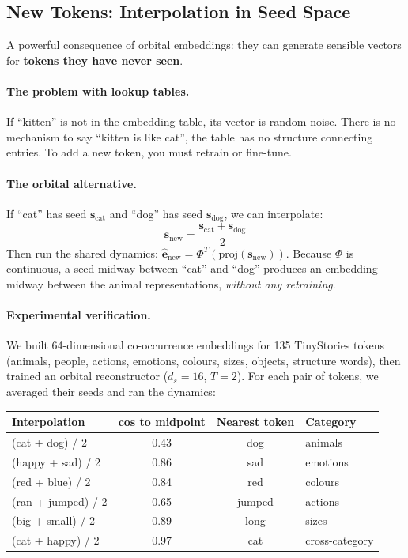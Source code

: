 \documentclass[11pt, a4paper]{article}
\newcommand{\s}{\mathbf{s}}
\theoremstyle{remark}
\begin{document}
\subsection{New Tokens: Interpolation in Seed Space}

A powerful consequence of orbital embeddings: they can generate sensible vectors for \textbf{tokens they have never seen}.

\paragraph{The problem with lookup tables.}
If ``kitten'' is not in the embedding table, its vector is random noise.
There is no mechanism to say ``kitten is like cat'', the table has no structure connecting entries.
To add a new token, you must retrain or fine-tune.

\paragraph{The orbital alternative.}
If ``cat'' has seed $\s_{\text{cat}}$ and ``dog'' has seed $\s_{\text{dog}}$, we can interpolate:
\[
    \s_{\text{new}} = \frac{\s_{\text{cat}} + \s_{\text{dog}}}{2}
\]
Then run the shared dynamics: $\hat{\mathbf{e}}_{\text{new}} = \Phi^T(\text{proj}(\s_{\text{new}}))$.
Because $\Phi$ is continuous, a seed midway between ``cat'' and ``dog'' produces an embedding midway between the animal representations, \emph{without any retraining}.

\paragraph{Experimental verification.}
We built 64-dimensional co-occurrence embeddings for 135 TinyStories tokens (animals, people, actions, emotions, colours, sizes, objects, structure words), then trained an orbital reconstructor ($d_s = 16$, $T = 2$).
For each pair of tokens, we averaged their seeds and ran the dynamics:

\begin{center}\small
\renewcommand{\arraystretch}{1.2}
\begin{tabular}{@{}lccl@{}}
\toprule
\textbf{Interpolation} & \textbf{cos to midpoint} & \textbf{Nearest token} & \textbf{Category} \\
\midrule
(cat + dog) / 2    & 0.43 & dog     & animals \\
(happy + sad) / 2  & 0.86 & sad     & emotions \\
(red + blue) / 2   & 0.84 & red     & colours \\
(ran + jumped) / 2 & 0.65 & jumped  & actions \\
(big + small) / 2  & 0.89 & long    & sizes \\
(cat + happy) / 2  & 0.97 & cat     & cross-category \\
\bottomrule
\end{tabular}
\end{center}
\end{document}
